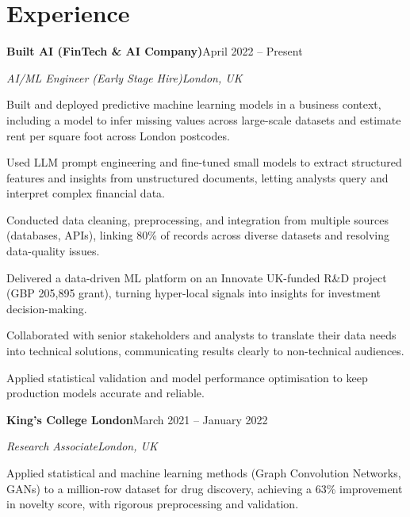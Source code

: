 \documentclass[10pt,a4paper]{article}
\newcommand{\entry}[4]{%
  {\color{company}\bfseries #1}\hfill {\color{muted}#2}\par
  \vspace{1pt}
  {\itshape #3}\hfill {\color{muted}\itshape #4}\par
  \vspace{3pt}%
}
\begin{document}
\section{Experience}
\entry{Built AI (FinTech \& AI Company)}{April 2022 -- Present}{AI/ML Engineer (Early Stage Hire)}{London, UK}
\begin{tight}
  \item Built and deployed predictive machine learning models in a business context, including a model to infer missing values across large-scale datasets and estimate rent per square foot across London postcodes.
  \item Used LLM prompt engineering and fine-tuned small models to extract structured features and insights from unstructured documents, letting analysts query and interpret complex financial data.
  \item Conducted data cleaning, preprocessing, and integration from multiple sources (databases, APIs), linking 80\% of records across diverse datasets and resolving data-quality issues.
  \item Delivered a data-driven ML platform on an Innovate UK-funded R\&D project (GBP 205,895 grant), turning hyper-local signals into insights for investment decision-making.
  \item Collaborated with senior stakeholders and analysts to translate their data needs into technical solutions, communicating results clearly to non-technical audiences.
  \item Applied statistical validation and model performance optimisation to keep production models accurate and reliable.
\end{tight}

\entry{King's College London}{March 2021 -- January 2022}{Research Associate}{London, UK}
\begin{tight}
  \item Applied statistical and machine learning methods (Graph Convolution Networks, GANs) to a million-row dataset for drug discovery, achieving a 63\% improvement in novelty score, with rigorous preprocessing and validation.
\end{tight}

\end{document}
